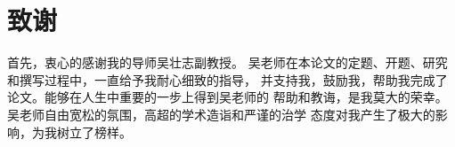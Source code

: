\chapter*{致谢}

\par
\quad \quad 首先，衷心的感谢我的导师\raisebox{0.5mm}{------}吴壮志副教授。
吴老师在本论文的定题、开题、研究和撰写过程中，一直给予我耐心细致的指导，
并支持我，鼓励我，帮助我完成了论文。能够在人生中重要的一步上得到吴老师的
帮助和教诲，是我莫大的荣幸。吴老师自由宽松的氛围，高超的学术造诣和严谨的治学
态度对我产生了极大的影响，为我树立了榜样。
\cleardoublepage
